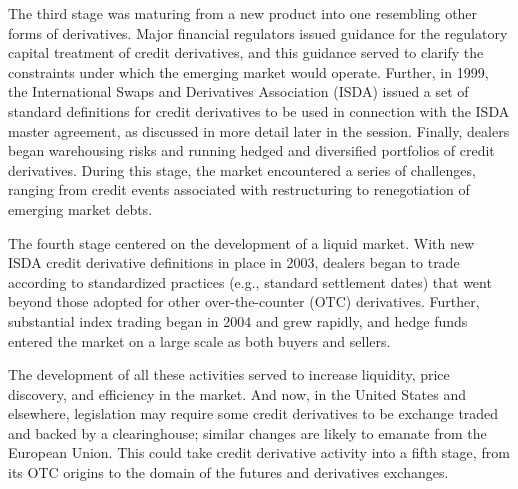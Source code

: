\documentclass[11pt]{article}
\begin{document}
The third stage was maturing from a new product into one resembling other forms of derivatives. Major financial regulators issued guidance for the regulatory capital treatment of credit derivatives, and this guidance served to clarify the constraints under which the emerging market would operate. Further, in 1999, the International Swaps and Derivatives Association (ISDA) issued a set of standard definitions for credit derivatives to be used in connection with the ISDA master agreement, as discussed in more detail later in the session. Finally, dealers began warehousing risks and running hedged and diversified portfolios of credit derivatives. During this stage, the market encountered a series of challenges, ranging from credit events associated with restructuring to renegotiation of emerging market debts.

The fourth stage centered on the development of a liquid market. With new ISDA credit derivative definitions in place in 2003, dealers began to trade according to standardized practices (e.g., standard settlement dates) that went beyond those adopted for other over-the-counter (OTC) derivatives. Further, substantial index trading began in 2004 and grew rapidly, and hedge funds entered the market on a large scale as both buyers and sellers.

The development of all these activities served to increase liquidity, price discovery, and efficiency in the market. And now, in the United States and elsewhere, legislation may require some credit derivatives to be exchange traded and backed by a clearinghouse; similar changes are likely to emanate from the European Union. This could take credit derivative activity into a fifth stage, from its OTC origins to the domain of the futures and derivatives exchanges.
\end{document}
